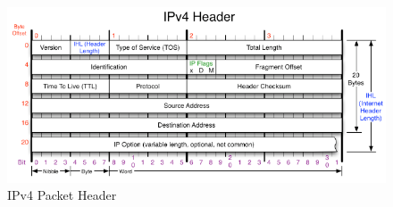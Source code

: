 \documentclass[final_report.tex]{subfiles}
\begin{document}
\begin{figure}[H]
	\centering
	\includegraphics[width=\textwidth]{img/ipv4header.png}
	\caption{IPv4 Packet Header}
	\label{fig:ipv4}
\end{figure}
\end{document}
